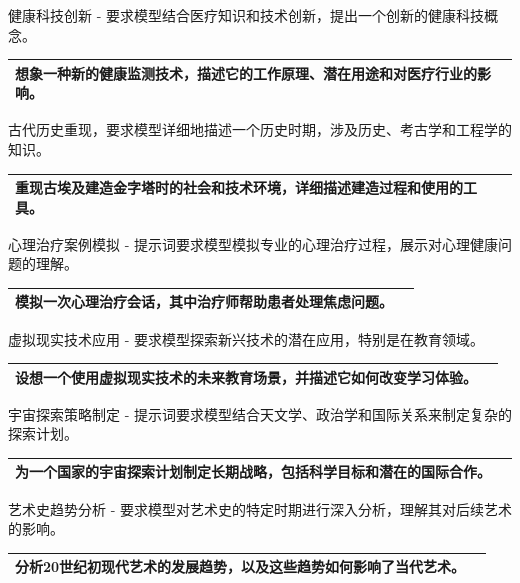 \documentclass[12pt]{book}
\begin{document}
\bigskip
健康科技创新  - 要求模型结合医疗知识和技术创新，提出一个创新的健康科技概念。

\begin{tabular}{|p{15cm}|p{3cm}|}
	\hline
想象一种新的健康监测技术，描述它的工作原理、潜在用途和对医疗行业的影响。\\
	\hline
\end{tabular}



\bigskip
古代历史重现，要求模型详细地描述一个历史时期，涉及历史、考古学和工程学的知识。

\begin{tabular}{|p{15cm}|p{3cm}|}
	\hline
重现古埃及建造金字塔时的社会和技术环境，详细描述建造过程和使用的工具。 \\
	\hline
\end{tabular}


\bigskip
心理治疗案例模拟  - 提示词要求模型模拟专业的心理治疗过程，展示对心理健康问题的理解。

\begin{tabular}{|p{15cm}|p{3cm}|}
	\hline
模拟一次心理治疗会话，其中治疗师帮助患者处理焦虑问题。\\
	\hline
\end{tabular}



\bigskip
虚拟现实技术应用  - 要求模型探索新兴技术的潜在应用，特别是在教育领域。

\begin{tabular}{|p{15cm}|p{3cm}|}
	\hline
设想一个使用虚拟现实技术的未来教育场景，并描述它如何改变学习体验。\\
	\hline
\end{tabular}


\bigskip
宇宙探索策略制定  - 提示词要求模型结合天文学、政治学和国际关系来制定复杂的探索计划。

\begin{tabular}{|p{15cm}|p{3cm}|}
	\hline
为一个国家的宇宙探索计划制定长期战略，包括科学目标和潜在的国际合作。\\
	\hline
\end{tabular}


\bigskip
艺术史趋势分析  - 要求模型对艺术史的特定时期进行深入分析，理解其对后续艺术的影响。

\begin{tabular}{|p{15cm}|p{3cm}|}
	\hline
分析20世纪初现代艺术的发展趋势，以及这些趋势如何影响了当代艺术。\\
	\hline
\end{tabular}
\end{document}

